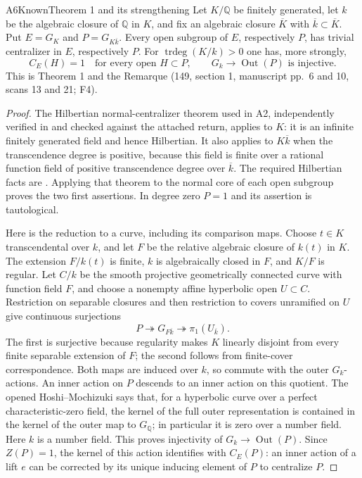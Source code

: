 \begin{result}{A6}{Known}{Theorem 1 and its strengthening}
\label{res:A6}
Let $K/\mathbb Q$ be finitely generated, let $k$ be the algebraic closure
of $\mathbb Q$ in $K$, and fix an algebraic closure $\overline K$ with
$\overline k\subset\overline K$. Put
$E=G_K$ and $P=G_{K\overline k}$. Every open subgroup of $E$, respectively
$P$, has trivial centralizer in $E$, respectively $P$. For
$\operatorname{trdeg}(K/k)>0$ one has, more strongly,
\[
 C_E(H)=1\quad\text{for every open }H\subset P,
 \qquad G_k\longrightarrow\operatorname{Out}(P)\text{ is injective}.
\]
This is Theorem 1 and the Remarque (149, section 1, manuscript pp.~6 and
10, scans 13 and 21; F4).
\end{result}
\begin{proof}
The Hilbertian normal-centralizer theorem used in A2, independently
verified in\cite[Theorem 2.7 and Proposition 1.2]{AB_MinamideTsujimura2022}
and checked against the attached return\cite{AB_Cyclotomic}, applies to $K$: it is an infinite finitely generated
field and hence Hilbertian. It also applies to $K\overline k$ when the
transcendence degree is positive, because this field is finite over a
rational function field of positive transcendence degree over
$\overline k$. The required Hilbertian facts are
\cite[section 4, Theorem 2(a),(d),(e)]{AB_Geyer2012}. Applying that theorem to the
normal core of each open subgroup proves the two first assertions. In
degree zero $P=1$ and its assertion is tautological.

Here is the reduction to a curve, including its comparison maps. Choose
$t\in K$ transcendental over $k$, and let $F$ be the relative algebraic
closure of $k(t)$ in $K$. The extension $F/k(t)$ is finite, $k$ is
algebraically closed in $F$, and $K/F$ is regular. Let $C/k$ be the smooth
projective geometrically connected curve with function field $F$, and
choose a nonempty affine hyperbolic open $U\subset C$. Restriction on
separable closures and then restriction to covers unramified on $U$ give
continuous surjections
\[
 P\twoheadrightarrow G_{F\overline k}
   \twoheadrightarrow\pi_1(U_{\overline k}).
\]
The first is surjective because regularity makes $K$ linearly disjoint
from every finite separable extension of $F$; the second follows from
finite-cover correspondence. Both maps are induced over $k$, so commute
with the outer $G_k$-actions. An inner action on $P$ descends to an inner
action on this quotient. The opened Hoshi--Mochizuki
\cite[Theorem C(ii)]{AB_HoshiMochizuki2011} says that, for a hyperbolic
curve over a perfect characteristic-zero field, the kernel of the full
outer representation is contained in the kernel of the outer map to
$G_{\mathbb Q}$; in particular it is zero over a number field.
Here $k$ is a number field. This proves injectivity of $G_k\to\operatorname{Out}(P)$.
Since $Z(P)=1$, the kernel of this action identifies with $C_E(P)$:
an inner action of a lift $e$ can be corrected by its unique inducing
element of $P$ to centralize $P$.


\end{proof}

